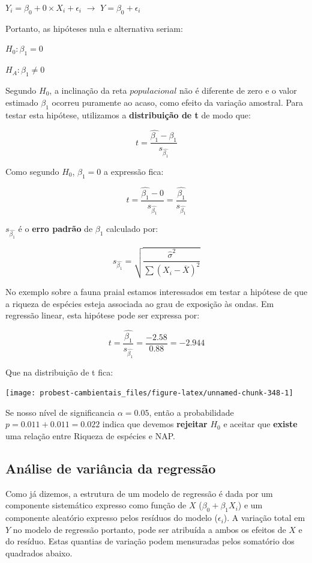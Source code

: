 \documentclass[
]{book}
\begin{document}
\(Y_i = \beta_0 + 0 \times X_i + \epsilon_i\) \(\rightarrow\) \(Y = \beta_0 + \epsilon_i\)

Portanto, as hipóteses nula e alternativa seriam:

\(H_0: \beta_1 = 0\)

\(H_A: \beta_1 \ne 0\)

Segundo \(H_0\), a inclinação da reta \(populacional\) não é diferente de zero e o valor estimado \(\hat{\beta_1}\) ocorreu puramente ao acaso, como efeito da variação amostral. Para testar esta hipótese, utilizamos a \textbf{distribuição de t} de modo que:

\[t = \frac{\hat{\beta_1} - \beta_1}{s_{\hat{\beta_1}}}\]

Como segundo \(H_0\), \(\beta_1 = 0\) a expressão fica:

\[t = \frac{\hat{\beta_1} - 0}{s_{\hat{\beta_1}}} = \frac{\hat{\beta_1}}{s_{\hat{\beta_1}}}\]

\(s_{\hat{\beta_1}}\) é o \textbf{erro padrão} de \(\beta_1\) calculado por:

\[s_{\hat{\beta_1}} = \sqrt{\frac{\hat{\sigma}^2}{\sum{(X_i-\overline{X})^2}}}\]

No exemplo sobre a fauna praial estamos interessados em testar a hipótese de que a riqueza de espécies esteja associada ao grau de exposição às ondas. Em regressão linear, esta hipótese pode ser expressa por:

\[t = \frac{\hat{\beta_1}}{s_{\hat{\beta_1}}} = \frac{-2.58}{0.88} = -2.944\]

Que na distribuição de t fica:

\begin{center}\texttt{[image: probest-cambientais\_files/figure-latex/unnamed-chunk-348-1]} \end{center}

Se nosso nível de significancia \(\alpha = 0.05\), então a probabilidade \(p = 0.011 + 0.011 = 0.022\) indica que devemos \textbf{rejeitar} \(H_0\) e aceitar que \textbf{existe} uma relação entre Riqueza de espécies e NAP.

\hypertarget{anuxe1lise-de-variuxe2ncia-da-regressuxe3o}{%
\subsection{Análise de variância da regressão}\label{anuxe1lise-de-variuxe2ncia-da-regressuxe3o}}

Como já dizemos, a estrutura de um modelo de regressão é dada por um componente sistemático expresso como função de \(X\) (\(\beta_0 + \beta_1X_i\)) e um componente aleatório expresso pelos resíduos do modelo (\(\epsilon_i\)). A variação total em \(Y\) no modelo de regressão portanto, pode ser atribuída a ambos os efeitos de \(X\) e do resíduo. Estas quantias de variação podem mensuradas pelos somatório dos quadrados abaixo.
\end{document}
